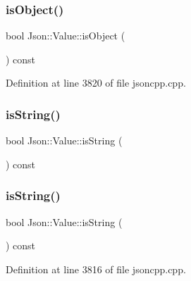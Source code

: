 \hypertarget{class_json_1_1_value_a8cf96c0f2a552051fcfc78ffee60e037}{}\label{class_json_1_1_value_a8cf96c0f2a552051fcfc78ffee60e037} 
\subsubsection{\texorpdfstring{is\+Object()}{isObject()}\hspace{0.1cm}{\footnotesize\ttfamily [2/2]}}
{\footnotesize\ttfamily bool Json\+::\+Value\+::is\+Object (\begin{DoxyParamCaption}{ }\end{DoxyParamCaption}) const}



Definition at line 3820 of file jsoncpp.\+cpp.

\hypertarget{class_json_1_1_value_a71e1f82cf1c3eaf969d400dcffb163a6}{}\label{class_json_1_1_value_a71e1f82cf1c3eaf969d400dcffb163a6} 
\subsubsection{\texorpdfstring{is\+String()}{isString()}\hspace{0.1cm}{\footnotesize\ttfamily [1/2]}}
{\footnotesize\ttfamily bool Json\+::\+Value\+::is\+String (\begin{DoxyParamCaption}{ }\end{DoxyParamCaption}) const}

\hypertarget{class_json_1_1_value_a71e1f82cf1c3eaf969d400dcffb163a6}{}\label{class_json_1_1_value_a71e1f82cf1c3eaf969d400dcffb163a6} 
\subsubsection{\texorpdfstring{is\+String()}{isString()}\hspace{0.1cm}{\footnotesize\ttfamily [2/2]}}
{\footnotesize\ttfamily bool Json\+::\+Value\+::is\+String (\begin{DoxyParamCaption}{ }\end{DoxyParamCaption}) const}



Definition at line 3816 of file jsoncpp.\+cpp.

